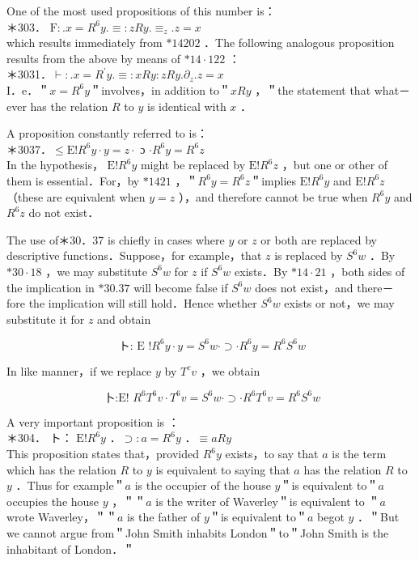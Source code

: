 \documentclass[10pt]{article}
\begin{document}
One of the most used propositions of this number is：\\
＊303． $\mathrm{F}: . x=R^{6} y . \equiv: z R y . \equiv_{z} . z=x$\\
which results immediately from $* 14202$ ．The following analogous proposition results from the above by means of $* 14 \cdot 122$ ：\\
＊3031．$\vdash: . x=R^{\prime} y . \equiv: x R y: z R y . \partial_{z} . z=x$\\
I．e．＂$x=R^{6} y$＂involves，in addition to＂$x R y$ ，＂the statement that what－ ever has the relation $R$ to $y$ is identical with $x$ ．

A proposition constantly referred to is：\\
＊3037．$\leqslant \mathrm{E}!R^{6} y \cdot y=z \cdot$ ɔ $\cdot R^{6} y=R^{6} z$\\
In the hypothesis， $\mathrm{E}!R^{6} y$ might be replaced by $\mathrm{E}!R^{6} z$ ，but one or other of them is essential．For，by $* 1421$ ，＂$R^{6} y=R^{6} z$＂implies $\mathrm{E}!R^{6} y$ and $\mathrm{E}!R^{6} z$ （these are equivalent when $y=z$ ），and therefore cannot be true when $R^{6} y$ and $R^{6} z$ do not exist．

The use of＊30．37 is chiefly in cases where $y$ or $z$ or both are replaced by descriptive functions．Suppose，for example，that $z$ is replaced by $S^{6} w$ ．By $* 30 \cdot 18$ ，we may substitute $S^{6} w$ for $z$ if $S^{6} w$ exists．By $* 14 \cdot 21$ ，both sides of the implication in $* 30.37$ will become false if $S^{6} w$ does not exist，and there－ fore the implication will still hold．Hence whether $S^{6} w$ exists or not，we may substitute it for $z$ and obtain

$$
\text { ト: E }!R^{6} y \cdot y=S^{6} w \cdot \supset \cdot R^{6} y=R^{6} S^{6} w
$$

In like manner，if we replace $y$ by $T^{c} v$ ，we obtain

$$
\text { 卜:E! } R^{6} T^{6} v \cdot T^{6} v=S^{6} w \cdot \supset \cdot R^{6} T^{6} v=R^{6} S^{6} w
$$

A very important proposition is ：\\
＊304． ト： $\mathrm{E}!R^{6} y$ ．$\supset: a=R^{6} y$ ．$\equiv a R y$\\
This proposition states that，provided $R^{6} y$ exists，to say that $a$ is the term which has the relation $R$ to $y$ is equivalent to saying that $a$ has the relation $R$ to $y$ ．Thus for example＂$a$ is the occupier of the house $y$＂is equivalent to＂$a$ occupies the house $y$ ，＂＂$a$ is the writer of Waverley＂is equivalent to ＂$a$ wrote Waverley，＂＂$a$ is the father of $y$＂is equivalent to＂$a$ begot $y$ ．＂But we cannot argue from＂John Smith inhabits London＂to＂John Smith is the inhabitant of London．＂
\end{document}
